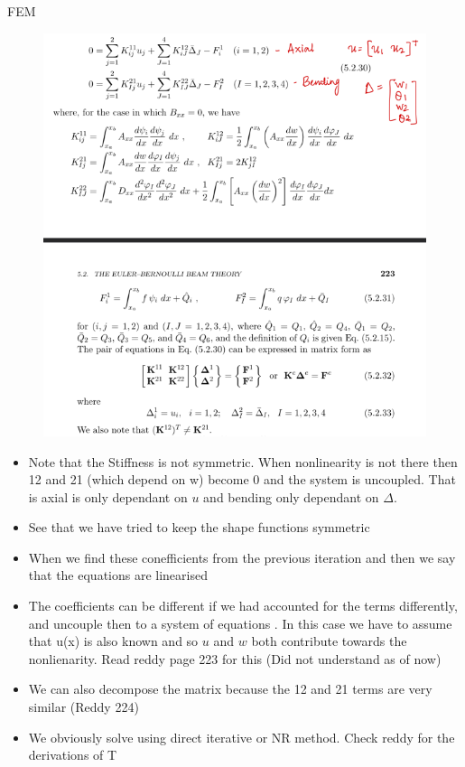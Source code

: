 	\begin{frame}{FEM}
		\begin{figure}
			\centering
			\includegraphics[width=0.66 \linewidth]{Figure/fig21} 		
		\end{figure}
	\end{frame}


	\begin{frame}
		\begin{itemize}
			\item Note that the Stiffness is not symmetric. When nonlinearity is not there then 12 and 21 (which depend on w) become 0 and the system is uncoupled. That is axial is only dependant on $u$ and bending only dependant on $\Delta$.
			\item See that we have tried to keep the shape functions symmetric
			\item When we find these conefficients from the previous iteration and then we say that the equations are linearised
			\item  The coefficients can be different if we had accounted for the terms differently, and uncouple then to a system of equations . In this case we have to assume that u(x) is also known and so $u$ and $w$ both contribute towards the nonlienarity. Read reddy page 223 for this (Did not understand as of now)
			\item  We can also decompose the matrix because the 12 and 21 terms are very similar (Reddy 224)
			\item We obviously solve using direct iterative or NR method. Check reddy for the derivations of T 
		\end{itemize}
	\end{frame}


